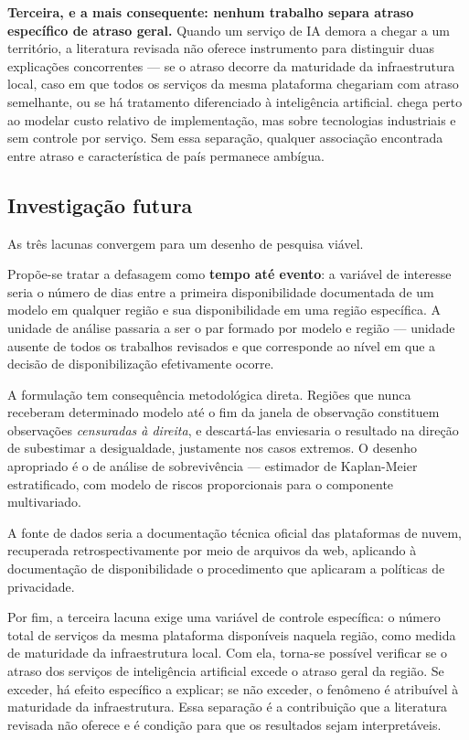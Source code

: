 \documentclass[12pt,a4paper]{article}
\begin{document}
\textbf{Terceira, e a mais consequente: nenhum trabalho separa atraso específico de
atraso geral.} Quando um serviço de IA demora a chegar a um território, a literatura
revisada não oferece instrumento para distinguir duas explicações concorrentes --- se o
atraso decorre da maturidade da infraestrutura local, caso em que todos os serviços da
mesma plataforma chegariam com atraso semelhante, ou se há tratamento diferenciado à
inteligência artificial. \textcite{knez2023} chega perto ao modelar custo relativo de
implementação, mas sobre tecnologias industriais e sem controle por serviço.
Sem essa separação, qualquer associação encontrada entre atraso e característica de
país permanece ambígua.

\subsection{Investigação futura}

As três lacunas convergem para um desenho de pesquisa viável.

Propõe-se tratar a defasagem como \textbf{tempo até evento}: a variável de interesse
seria o número de dias entre a primeira disponibilidade documentada de um modelo em
qualquer região e sua disponibilidade em uma região específica. A unidade de análise
passaria a ser o par formado por modelo e região --- unidade ausente de todos os
trabalhos revisados e que corresponde ao nível em que a decisão de disponibilização
efetivamente ocorre.

A formulação tem consequência metodológica direta. Regiões que nunca receberam
determinado modelo até o fim da janela de observação constituem observações
\emph{censuradas à direita}, e descartá-las enviesaria o resultado na direção de
subestimar a desigualdade, justamente nos casos extremos. O desenho apropriado é o de
análise de sobrevivência --- estimador de Kaplan-Meier estratificado, com modelo de
riscos proporcionais para o componente multivariado.

A fonte de dados seria a documentação técnica oficial das plataformas de nuvem,
recuperada retrospectivamente por meio de arquivos da web, aplicando à
documentação de disponibilidade o procedimento que \textcite{amos2021} aplicaram a
políticas de privacidade.

Por fim, a terceira lacuna exige uma variável de controle específica: o número total
de serviços da mesma plataforma disponíveis naquela região, como medida de maturidade
da infraestrutura local. Com ela, torna-se possível verificar se o atraso dos serviços
de inteligência artificial excede o atraso geral da região. Se exceder, há efeito
específico a explicar; se não exceder, o fenômeno é atribuível à maturidade da
infraestrutura. Essa separação é a contribuição que a literatura revisada não oferece
e é condição para que os resultados sejam interpretáveis.
\end{document}
